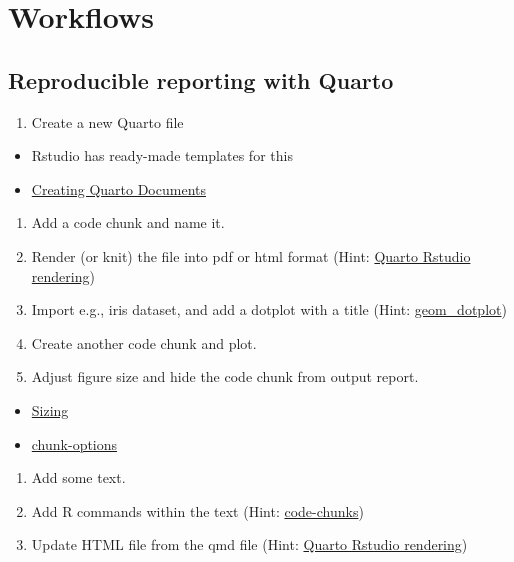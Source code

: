 \documentclass[
]{book}
\providecommand{\tightlist}{%
  \setlength{\itemsep}{0pt}\setlength{\parskip}{0pt}}
\begin{document}
\hypertarget{workflows}{%
\section{Workflows}\label{workflows}}

\hypertarget{reproducible-reporting-with-quarto}{%
\subsection{Reproducible reporting with Quarto}\label{reproducible-reporting-with-quarto}}

\begin{enumerate}
\def\labelenumi{\arabic{enumi}.}
\tightlist
\item
  Create a new Quarto file
\end{enumerate}

\begin{itemize}
\tightlist
\item
  Rstudio has ready-made templates for this
\item
  \href{https://quarto.org/docs/tools/rstudio.html\#creating-documents}{Creating Quarto Documents}
\end{itemize}

\begin{enumerate}
\def\labelenumi{\arabic{enumi}.}
\setcounter{enumi}{1}
\tightlist
\item
  Add a code chunk and name it.
\item
  Render (or knit) the file into pdf or html format (Hint: \href{https://quarto.org/docs/tools/rstudio.html\#render-and-preview}{Quarto Rstudio rendering})
\item
  Import e.g., iris dataset, and add a dotplot with a title (Hint: \href{https://ggplot2.tidyverse.org/reference/geom_dotplot.html}{geom\_dotplot})
\item
  Create another code chunk and plot.
\item
  Adjust figure size and hide the code chunk from output report.
\end{enumerate}

\begin{itemize}
\tightlist
\item
  \href{https://quarto.org/docs/authoring/diagrams.html\#sizing}{Sizing}
\item
  \href{https://quarto.org/docs/computations/r.html\#chunk-options}{chunk-options}
\end{itemize}

\begin{enumerate}
\def\labelenumi{\arabic{enumi}.}
\setcounter{enumi}{6}
\tightlist
\item
  Add some text.
\item
  Add R commands within the text (Hint: \href{https://quarto.org/docs/visual-editor/technical.html\#code-chunks}{code-chunks})
\item
  Update HTML file from the qmd file (Hint: \href{https://quarto.org/docs/tools/rstudio.html\#render-and-preview}{Quarto Rstudio rendering})
\end{enumerate}
\end{document}
